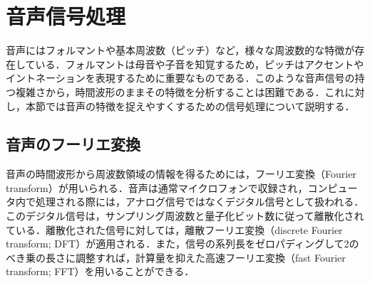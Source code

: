 \section{音声信号処理}
音声にはフォルマントや基本周波数（ピッチ）など，様々な周波数的な特徴が存在している．フォルマントは母音や子音を知覚するため，ピッチはアクセントやイントネーションを表現するために重要なものである．このような音声信号の持つ複雑さから，時間波形のままその特徴を分析することは困難である．これに対し，本節では音声の特徴を捉えやすくするための信号処理について説明する．

\subsection{音声のフーリエ変換}
音声の時間波形から周波数領域の情報を得るためには，フーリエ変換（Fourier transform）が用いられる．音声は通常マイクロフォンで収録され，コンピュータ内で処理される際には，アナログ信号ではなくデジタル信号として扱われる．このデジタル信号は，サンプリング周波数と量子化ビット数に従って離散化されている．離散化された信号に対しては，離散フーリエ変換（discrete Fourier transform; DFT）が適用される．また，信号の系列長をゼロパディングして2のべき乗の長さに調整すれば，計算量を抑えた高速フーリエ変換（fast Fourier transform; FFT）を用いることができる．


